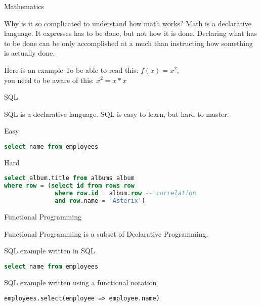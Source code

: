\begin{frame}{Mathematics}
\begin{block}{Why is it so complicated to understand how math works?}
Math is a declarative language. It expresses  has to be done,
but not \alert{how} it is done. Declaring what has to be done can be only
accomplished at a much  than
instructing how something is actually done.
\end{block}
\pause
\begin{exampleblock}{Here is an example}
To be able to read this: \(f(x) = x^2\),\\ you need to be aware of this: \(x^2 =
x*x\)
\end{exampleblock}
\end{frame}

\begin{frame}[fragile]{SQL}
\begin{center}
SQL is a declarative language. SQL is easy to learn, but hard to master.
\end{center}
\pause
\begin{exampleblock}{Easy}
\begin{lstlisting}[language=sql]
select name from employees
\end{lstlisting}
\end{exampleblock}
\pause
\begin{alertblock}{Hard}
\begin{lstlisting}[language=sql]
select album.title from albums album
where row = (select id from rows row
              where row.id = album.row -- correlation
              and row.name = 'Asterix')
\end{lstlisting}
\end{alertblock}
\end{frame}

\begin{frame}[fragile]{Functional Programming}
\begin{center}
Functional Programming is a subset of Declarative Programming.
\end{center}
\pause
\begin{exampleblock}{SQL example written in SQL}
\begin{lstlisting}[language=sql]
select name from employees
\end{lstlisting}
\end{exampleblock}
\pause
\begin{exampleblock}{SQL example written using a functional notation}
\begin{lstlisting}
employees.select(employee => employee.name)
\end{lstlisting}
\end{exampleblock}
\end{frame}

